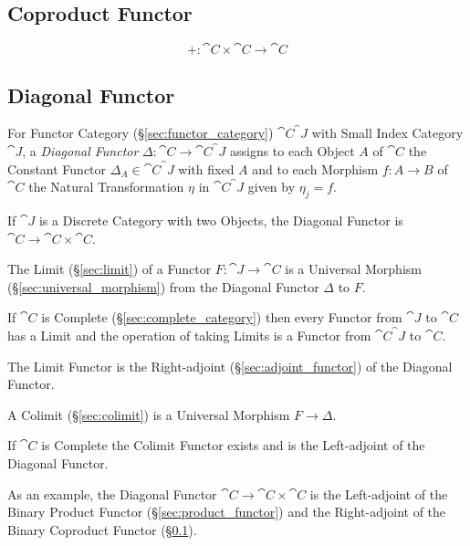 \subsection{Coproduct Functor}\label{sec:coproduct_functor}

\[
  + : \cat{C} \times \cat{C} \rightarrow \cat{C}
\]



\subsection{Diagonal Functor}\label{sec:diagonal_functor}

For Functor Category (\S\ref{sec:functor_category})
$\cat{C}^\cat{J}$ with Small Index Category $\cat{J}$, a
\emph{Diagonal Functor} $\Delta : \cat{C} \rightarrow
\cat{C}^\cat{J}$ assigns to each Object $A$ of $\cat{C}$ the
Constant Functor $\Delta_A \in \cat{C}^\cat{J}$ with fixed $A$
and to each Morphism $f : A \rightarrow B$ of $\cat{C}$ the Natural
Transformation $\eta$ in $\cat{C}^\cat{J}$ given by $\eta_j =
f$.

If $\cat{J}$ is a Discrete Category with two Objects, the Diagonal
Functor is $\cat{C} \rightarrow \cat{C} \times \cat{C}$.

The Limit (\S\ref{sec:limit}) of a Functor $F : \cat{J} \rightarrow
\cat{C}$ is a Universal Morphism (\S\ref{sec:universal_morphism})
from the Diagonal Functor $\Delta$ to $F$.

If $\cat{C}$ is Complete (\S\ref{sec:complete_category}) then every
Functor from $\cat{J}$ to $\cat{C}$ has a Limit and the
operation of taking Limits is a Functor from $\cat{C}^\cat{J}$
to $\cat{C}$.

The Limit Functor is the Right-adjoint (\S\ref{sec:adjoint_functor})
of the Diagonal Functor.

A Colimit (\S\ref{sec:colimit}) is a Universal Morphism $F \rightarrow
\Delta$.

If $\cat{C}$ is Complete the Colimit Functor exists and is the
Left-adjoint of the Diagonal Functor.

As an example, the Diagonal Functor $\cat{C} \rightarrow \cat{C}
\times \cat{C}$ is the Left-adjoint of the Binary Product Functor
(\S\ref{sec:product_functor}) and the Right-adjoint of the Binary
Coproduct Functor (\S\ref{sec:coproduct_functor}).



